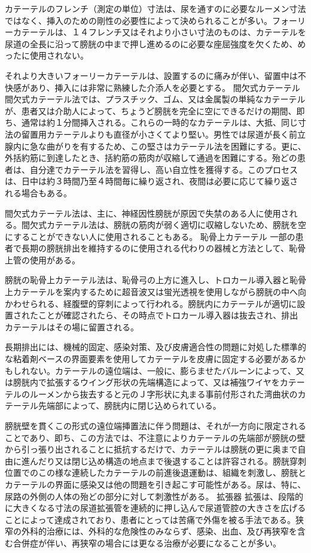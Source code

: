 カテーテルのフレンチ（測定の単位）寸法は、尿を通すのに必要なルーメン寸法ではなく、挿入のための剛性の必要性によって決められることが多い。フォーリーカテーテルは、１４フレンチ又はそれより小さい寸法のものは、カテーテルを尿道の全長に沿って膀胱の中まで押し進めるのに必要な座屈強度を欠くため、めったに使用されない。

それより大きいフォーリーカテーテルは、設置するのに痛みが伴い、留置中は不快感があり、挿入には非常に熟練した介添人を必要とする。 間欠式カテーテル 間欠式カテーテル法では、プラスチック、ゴム、又は金属製の単純なカテーテルが、患者又は介助人によって、ちょうど膀胱を完全に空にできるだけの期間、即ち、通常は約１分間挿入される。これらの一時的なカテーテルは、大抵、同じ寸法の留置用カテーテルよりも直径が小さくてより堅い。男性では尿道が長く前立腺内に急な曲がりを有するため、この堅さはカテーテル法を困難にする。更に、外括約筋に到達したとき、括約筋の筋肉が収縮して通過を困難にする。殆どの患者は、自分達でカテーテル法を習得し、高い自立性を獲得する。このプロセスは、日中は約３時間乃至４時間毎に繰り返され、夜間は必要に応じて繰り返される場合もある。

間欠式カテーテル法は、主に、神経因性膀胱が原因で失禁のある人に使用される。間欠式カテーテル法は、膀胱の筋肉が弱く適切に収縮しないため、膀胱を空にすることができない人に使用されることもある。 恥骨上カテーテル 一部の患者で長期の膀胱排出を維持するのに使用される代わりの器械と方法として、恥骨上管の使用がある。

膀胱の恥骨上カテーテル法は、恥骨弓の上方に進入し、トロカール導入器と恥骨上カテーテルを案内するために超音波又は蛍光透視を使用しながら膀胱の中へ向かわせられる、経腹壁的穿刺によって行われる。膀胱内にカテーテルが適切に設置されたことが確認されたら、その時点でトロカール導入器は抜去され、排出カテーテルはその場に留置される。

長期排出には、機械的固定、感染対策、及び皮膚適合性の問題に対処した標準的な粘着剤ベースの界面要素を使用してカテーテルを皮膚に固定する必要があるかもしれない。カテーテルの遠位端は、一般に、膨らませたバルーンによって、又は膀胱内で拡張するウイング形状の先端構造によって、又は補強ワイヤをカテーテルのルーメンから抜去すると元のＪ字形状に丸まる事前付形された湾曲状のカテーテル先端部によって、膀胱内に閉じ込められている。

膀胱壁を貫くこの形式の遠位端挿置法に伴う問題は、それが一方向に限定されることであり、即ち、この方法では、不注意によりカテーテルの先端部が膀胱の壁から引っ張り出されることに抵抗するだけで、カテーテルは膀胱の更に奥まで自由に進んだり又は閉じ込め構造の地点まで後退することは許容される。膀胱穿刺位置でのこの様な連続したカテーテルの前進後退運動は、組織を刺激し、膀胱とカテーテルの界面に感染又は他の問題を引き起こす可能性がある。尿は、特に、尿路の外側の人体の殆どの部分に対して刺激性がある。 拡張器 拡張は、段階的に大きくなる寸法の尿道拡張管を連続的に押し込んで尿道管腔の大きさを広げることによって達成されており、患者にとっては苦痛で外傷を被る手法である。狭窄の外科的治療には、外科的な危険性のみならず、感染、出血、及び再狭窄を含む合併症が伴い、再狭窄の場合には更なる治療が必要になることが多い。


